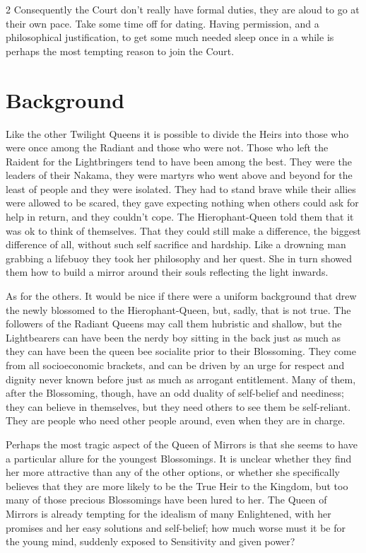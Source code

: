 \begin{multicols}{2}
Consequently the Court don’t really have formal duties, they are aloud to go at their own pace. Take some time off for dating. Having permission, and a philosophical justification, to get some much needed sleep once in a while is perhaps the most tempting reason to join the Court.

\section*{Background}
Like the other Twilight Queens it is possible to divide the Heirs into those who were once among the Radiant and those who were not. Those who left the Raident for the Lightbringers tend to have been among the best. They were the leaders of their Nakama, they were martyrs who went above and beyond for the least of people and they were isolated. They had to stand brave while their allies were allowed to be scared, they gave expecting nothing when others could ask for help in return, and they couldn't cope. The Hierophant-Queen told them that it was ok to think of themselves. That they could still make a difference, the biggest difference of all, without such self sacrifice and hardship. Like a drowning man grabbing a lifebuoy they took her philosophy and her quest. She in turn showed them how to build a mirror around their souls reflecting the light inwards.

As for the others. It would be nice if there were a uniform background that drew the newly blossomed to the Hierophant-Queen, but, sadly, that is not true. The followers of the Radiant Queens may call them hubristic and shallow, but the Lightbearers can have been the nerdy boy sitting in the back just as much as they can have been the queen bee socialite prior to their Blossoming. They come from all socioeconomic brackets, and can be driven by an urge for respect and dignity never known before just as much as arrogant entitlement. Many of them, after the Blossoming, though, have an odd duality of self-belief and neediness; they can believe in themselves, but they need others to see them be self-reliant. They are people who need other people around, even when they are in charge.

Perhaps the most tragic aspect of the Queen of Mirrors is that she seems to have a particular allure for the youngest Blossomings. It is unclear whether they find her more attractive than any of the other options, or whether she specifically believes that they are more likely to be the True Heir to the Kingdom, but too many of those precious Blossomings have been lured to her. The Queen of Mirrors is already tempting for the idealism of many Enlightened, with her promises and her easy solutions and self-belief; how much worse must it be for the young mind, suddenly exposed to Sensitivity and given power? 


\end{multicols}
